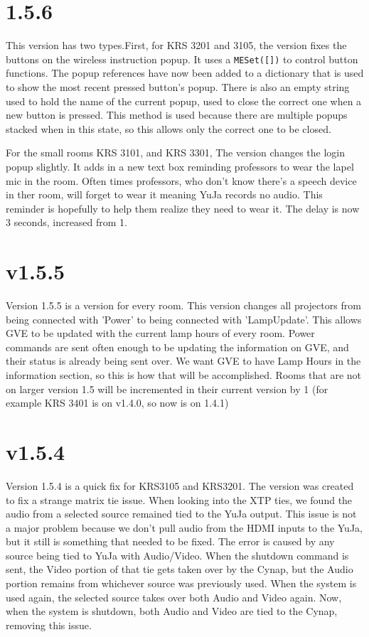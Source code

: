 \documentclass{article}
\begin{document}
\section*{1.5.6}

This version has two types.First, for KRS 3201 and 3105, the version fixes the buttons on the wireless instruction popup. It uses a
\lstinline|MESet([])| to control button functions. The popup references have now been added to a dictionary that is used to 
show the most recent pressed button's popup. There is also an empty string used to hold the name of the current popup, used
to close the correct one when a new button is pressed. This method is used because there are multiple popups stacked when in 
this state, so this allows only the correct one to be closed. 

For the small rooms KRS 3101, and KRS 3301, The version changes the login popup slightly. It adds in a new text box reminding 
professors to wear the lapel mic in the room. Often times professors, who don't know there's a speech device in ther room, 
will forget to wear it meaning YuJa records no audio. This reminder is hopefully to help them realize they need to wear it. 
The delay is now 3 seconds, increased from 1. 

\section*{v1.5.5}

Version 1.5.5 is a version for every room. This version changes all projectors from being connected with 'Power' to 
being connected with 'LampUpdate'. This allows GVE to be updated with the current lamp hours of every room. Power commands 
are sent often enough to be updating the information on GVE, and their status is already being sent over. We want GVE to have 
Lamp Hours in the information section, so this is how that will be accomplished. Rooms that are not on larger version 1.5 will 
be incremented in their current version by 1 (for example KRS 3401 is on v1.4.0, so now is on 1.4.1)

\section*{v1.5.4}

Version 1.5.4 is a quick fix for KRS3105 and KRS3201. The version was created to fix a strange matrix tie issue. When looking
into the XTP ties, we found the audio from a selected source remained tied to the YuJa output. This issue is not a major problem 
because we don't pull audio from the HDMI inputs to the YuJa, but it still is something that needed to be fixed. The error is caused
by any source being tied to YuJa with Audio/Video. When the shutdown command is sent, the Video portion of that tie gets taken 
over by the Cynap, but the Audio portion remains from whichever source was previously used. When the system is used again, the 
selected source takes over both Audio and Video again. Now, when the system is shutdown, both Audio and Video are tied to the Cynap,
removing this issue. 
\end{document}
